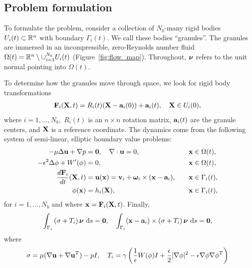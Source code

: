 \subsection{Problem formulation}
To formulate the problem, consider a collection of $N_b$-many rigid
bodies $U_i(t) \subset \RR^n$ with boundary $\Gamma_i(t)$. We call these
bodies ``granules''. The granules are immersed in an incompressible,
zero-Reynolds number fluid $\Omega(t) = \RR^n \setminus \cup_{i=1}^{N_b}
U_i(t)$ (Figure~\ref{fig:flow_map}). Throughout, $\nnu$ refers to
the unit normal pointing into $\Omega(t)$.

To determine how the granules move through space, we look for rigid body
transformations
\begin{align}
\label{eq:RBT}
  \FF_i(\XX,t) = R_i(t)(\XX - \aa_i(0)) + \aa_i(t),\quad \XX \in U_i(0),
\end{align}
where $i = 1,\ldots,N_b,$ $R_i(t)$ is an $n
\times n$ rotation matrix, $\aa_i(t)$ are the granule centers, and $\XX$ is a
reference coordinate.
The dynamics come from the following system of semi-linear, elliptic boundary value problems:
\begin{alignat}{4}
  \label{eqn:stokes} 
  -\mu\Delta \uu + \nabla p &= \mathbf{0}, 
  \quad \nabla \cdot \uu = 0, &&\xx \in \Omega(t), \\
  \label{eqn:phase}
  -\epsilon^2 \Delta \phi + W'(\phi) &= 0, &&\xx \in \Omega(t),\\
  \label{eqn:noslip}        
  \frac{d\FF_i}{dt}(\XX,t) & = \uu(\xx) = 
    \vv_i + \oomega_i \times (\xx - \aa_i), 
  \quad &&\xx \in \Gamma_i(t),\\
  \label{eqn:material}
  \phi(\xx) &= h_i(\XX),  &&\xx \in \Gamma_i(t),
\end{alignat}
for $i=1,\ldots,N_b$ and where $\xx = \FF_i(\XX,t)$. Finally,
\begin{align}
\label{eqn:stressbalance}
\int_{\Gamma_i} \left(\sigma  + T_i\right)\nnu \,\dif s = \mathbf{0},\quad
\int_{\Gamma_i} (\xx - \aa_i)\times \left(\sigma + T_i\right) \nnu
  \,\dif s = \mathbf{0},
\end{align}
where
\begin{align}
\label{eqn:hydro_stress}
\sigma = \mu(\nabla \uu + \nabla \uu^T) - pI,\quad 
T_i = \gamma\left(\frac{1}{\epsilon}W(\phi)I + \frac{\epsilon}{2}|\nabla \phi|^2 - \epsilon \nabla \phi \nabla \phi^T\right)
\end{align}
